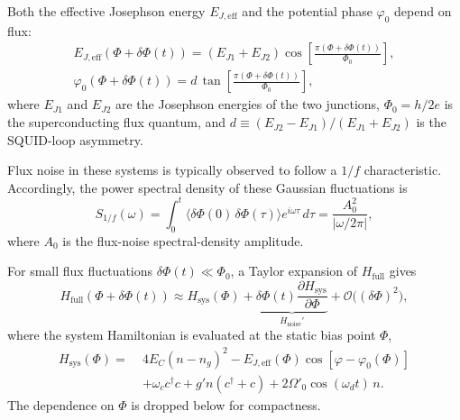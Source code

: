 Both the effective Josephson energy \(E_{J,\mathrm{eff}}\) and the potential phase \(\varphi_0\) depend on flux:
\begin{multline}
    E_{J,\mathrm{eff}}\!\left(\Phi+\delta\Phi(t)\right)
    = (E_{J1}+E_{J2}) \cos\!\left[\frac{\pi\left(\Phi+\delta\Phi(t)\right)}{\Phi_0}\right],\\
    \varphi_0\!\left(\Phi+\delta\Phi(t)\right)
    = d\, \tan\!\left[\frac{\pi\left(\Phi+\delta\Phi(t)\right)}{\Phi_0}\right],
\end{multline}
where \(E_{J1}\) and \(E_{J2}\) are the Josephson energies of the two junctions, \(\Phi_0=h/2e\) is the superconducting flux quantum, and \(d \equiv (E_{J2}-E_{J1})/({E_{J1}+E_{J2}})\) is the SQUID-loop asymmetry.

Flux noise in these systems is typically observed to follow a \(1/f\) characteristic. Accordingly, the power spectral density of these Gaussian fluctuations is
\begin{equation}
    S_{1/f}(\omega) = \int_0^{t} \langle \delta \Phi(0)\, \delta\Phi(\tau) \rangle e^{i\omega \tau}\, d\tau
    = \frac{A^2_0}{|\omega / 2 \pi|},
\end{equation}
where \(A_0\) is the flux-noise spectral-density amplitude.

For small flux fluctuations \(\delta\Phi(t)\ll\Phi_0\), a Taylor expansion of \(H_{\text{full}}\) gives
\begin{equation}
H_{\text{full}}\!\left(\Phi+\delta\Phi(t)\right)
\approx H_{\text{sys}}(\Phi) + \underbrace{\delta\Phi(t)\frac{\partial H_{\text{sys}}}{\partial \Phi}}_{H_{\text{noise}}'} 
+ \mathcal{O}\big((\delta \Phi)^2\big),
\end{equation}
where the system Hamiltonian is evaluated at the static bias point \(\Phi\),
\begin{equation}
\begin{aligned}
\label{system hamiltonian}
H_{\text{sys}}(\Phi) =\; & 4E_C (n-n_g)^2
- E_{J,\mathrm{eff}}(\Phi)
\cos\!\left[{\varphi}-{\varphi_0(\Phi)}\right] \\
& + \omega_c c^{\dagger}c
+ g' n (c^{\dagger}+c)
+ 2\Omega'_0 \cos(\omega_d t)\, n.
\end{aligned}
\end{equation}
The dependence on \(\Phi\) is dropped below for compactness.

